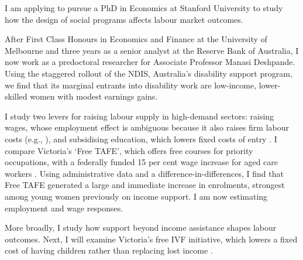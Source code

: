 \newcommand{\school}{Stanford University}
\newcommand{\program}{Economics}





 I am applying to pursue a PhD in \program{} at \school{} to study how the design of social programs affects labour market outcomes.

 After First Class Honours in Economics and Finance at the University of Melbourne and three years as a senior analyst at the Reserve Bank of Australia, I now work as a predoctoral researcher for Associate Professor Manasi Deshpande. Using the staggered rollout of the NDIS, Australia's disability support program, we find that its marginal entrants into disability work are low-income, lower-skilled women with modest earnings gains.

 I study two levers for raising labour supply in high-demand sectors: raising wages, whose employment effect is ambiguous because it also raises firm labour costs (e.g., \cite{dalbo_finan_rossi2013}), and subsidising education, which lowers fixed costs of entry \citep{schoonover2026}. I compare Victoria's `Free TAFE', which offers free courses for priority occupations, with a federally funded 15 per cent wage increase for aged care workers \citep{fwc_agedcare2022}. Using administrative data and a difference-in-differences, I find that Free TAFE generated a large and immediate increase in enrolments, strongest among young women previously on income support. I am now estimating employment and wage responses.

 More broadly, I study how support beyond income assistance shapes labour outcomes. Next, I will examine Victoria's free IVF initiative, which lowers a fixed cost of having children rather than replacing lost income \citep{gallen2026}.




